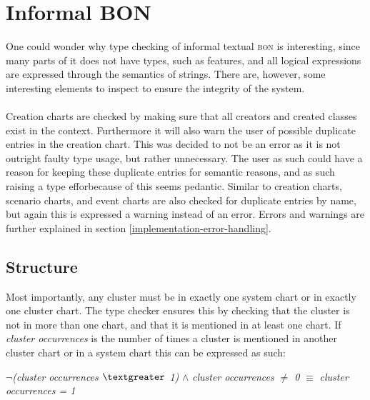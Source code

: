 \section{Informal BON}
One could wonder why type checking of informal textual \textsc{bon} is interesting, since many parts of it does not have types, such as features, and all logical expressions are expressed through the semantics of strings. There are, however, some interesting elements to inspect to ensure the integrity of the system.

\paragraph{}
Creation charts are checked by making sure that all creators and created classes exist in the context. Furthermore it will also warn the user of possible duplicate entries in the creation chart. This was decided to not be an error as it is not outright faulty type usage, but rather unnecessary. The user as such could have a reason for keeping these duplicate entries for semantic reasons, and as such raising a type efforbecause of this seems pedantic. Similar to creation charts, scenario charts, and event charts are also checked for duplicate entries by name, but again this is expressed a warning instead of an error. Errors and warnings are further explained in section \ref{implementation-error-handling}.

\subsection{Structure}
\label{implementation-informal-structure}
Most importantly, any cluster must be in exactly one system chart or in exactly one cluster chart. The type checker ensures this by checking that the cluster is not in more than one chart, and that it is mentioned in at least one chart. If \textit{cluster occurrences} is the number of times a cluster is mentioned in another cluster chart or in a system chart this can be expressed as such: 
{\footnotesize\begin{center} $\neg$\textit{(cluster occurrences $\textgreater$ 1)} $\wedge$ \textit{cluster occurrences $\neq$ 0} \textit{} $\equiv$  \textit{cluster occurrences = 1}
\end{center}}
